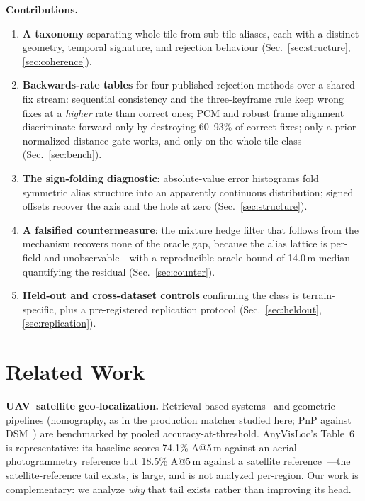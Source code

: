 \documentclass[journal]{IEEEtran}
\begin{document}
\noindent\textbf{Contributions.}
\begin{enumerate}
\item \textbf{A taxonomy} separating whole-tile from sub-tile aliases, each with a distinct geometry, temporal signature, and rejection behaviour (Sec.~\ref{sec:structure}, \ref{sec:coherence}).
\item \textbf{Backwards-rate tables} for four published rejection methods over a shared fix stream: sequential consistency and the three-keyframe rule keep wrong fixes at a \emph{higher} rate than correct ones; PCM and robust frame alignment discriminate forward only by destroying 60--93\% of correct fixes; only a prior-normalized distance gate works, and only on the whole-tile class (Sec.~\ref{sec:bench}).
\item \textbf{The sign-folding diagnostic}: absolute-value error histograms fold symmetric alias structure into an apparently continuous distribution; signed offsets recover the axis and the hole at zero (Sec.~\ref{sec:structure}).
\item \textbf{A falsified countermeasure}: the mixture hedge filter that follows from the mechanism recovers none of the oracle gap, because the alias lattice is per-field and unobservable---with a reproducible oracle bound of 14.0\,m median quantifying the residual (Sec.~\ref{sec:counter}).
\item \textbf{Held-out and cross-dataset controls} confirming the class is terrain-specific, plus a pre-registered replication protocol (Sec.~\ref{sec:heldout}, \ref{sec:replication}).
\end{enumerate}

\section{Related Work}

\textbf{UAV--satellite geo-localization.} Retrieval-based systems~\cite{uavvisloc,anyvisloc,denseuav} and geometric pipelines (homography, as in the production matcher studied here; PnP against DSM~\cite{ortholoc,orthotrack}) are benchmarked by pooled accuracy-at-threshold. AnyVisLoc's Table~6 is representative: its baseline scores 74.1\% A@5\,m against an aerial photogrammetry reference but 18.5\% A@5\,m against a satellite reference~\cite{anyvisloc}---the satellite-reference tail exists, is large, and is not analyzed per-region. Our work is complementary: we analyze \emph{why} that tail exists rather than improving its head.
\end{document}
